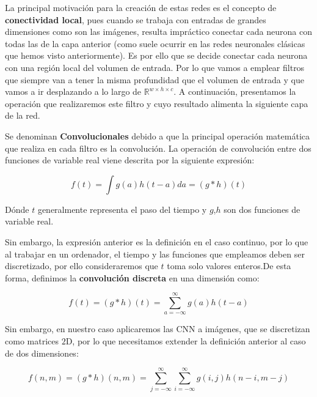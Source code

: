         \medskip

        \noindent La principal motivación para la creación de estas redes es el concepto de \textbf{conectividad local}, pues cuando se trabaja con entradas de grandes dimensiones como son las imágenes, resulta impráctico conectar cada neurona con todas las de la capa anterior (como suele ocurrir en las redes neuronales clásicas que hemos visto anteriormente). Es por ello que se decide conectar cada neurona con una región local del volumen de entrada. Por lo que vamos a emplear filtros que siempre van a tener la misma profundidad que el volumen de entrada y que vamos a ir desplazando a lo largo de $\mathbb{R}^{w\times h\times c}$. A continuación, presentamos la operación que realizaremos  este filtro y cuyo resultado alimenta la siguiente capa de la red.

        \medskip

        \noindent Se denominan \textbf{Convolucionales} debido a que la principal operación matemática que realiza en cada filtro es la convolución. La operación de convolución entre dos funciones de variable real viene descrita por la siguiente expresión:

        \begin{equation}
            f(t)=\int g(a) h(t-a) da = (g \ast h)(t)
        \end{equation}

        \noindent Dónde $t$ generalmente representa el paso del tiempo y $g$,$h$ son dos funciones de variable real.

        \medskip

        \noindent Sin embargo, la expresión anterior es la definición en el caso continuo, por lo que al trabajar en un ordenador, el tiempo y las funciones que empleamos deben ser discretizado, por ello consideraremos que $t$ toma solo valores enteros.De esta forma, definimos la \textbf{convolución discreta} en una dimensión como: 

        \begin{equation}
            f(t)= (g \ast h)(t) = \sum_{a=-\infty}^\infty g(a) h(t-a)
        \end{equation}

        \medskip

        \noindent Sin embargo, en nuestro caso aplicaremos las CNN a imágenes, que se discretizan como matrices $2$D, por lo que necesitamos extender la definición anterior al caso de dos dimensiones: 

        \begin{equation}
            f(n,m)= (g \ast h)(n,m) = \sum_{j=-\infty}^\infty \sum_{i=-\infty}^\infty g(i,j) h(n-i,m-j)
        \end{equation}

